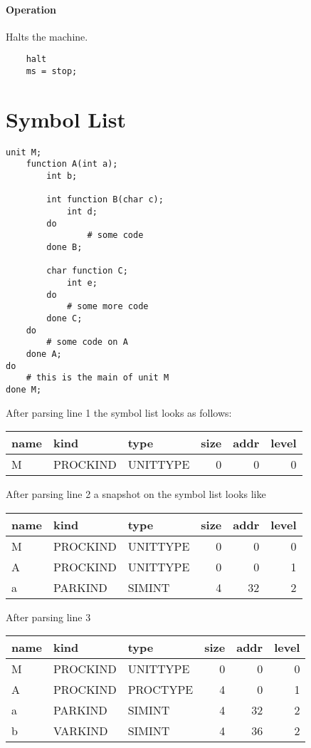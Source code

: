 \subsubsection{Operation}
Halts the machine.

	\begin{lstlisting}
	halt
	ms = stop;
	\end{lstlisting}

\chapter{Symbol List}

\lstset{language=NoBeard,
	numbers=left,
	tabsize=2
}
\begin{lstlisting}
unit M;
	function A(int a);
		int b;
		
		int function B(char c);
			int d;
		do
				# some code
		done B;
		
		char function C;
			int e;
		do
			# some more code
		done C;
	do
		# some code on A
	done A;
do
	# this is the main of unit M
done M;
\end{lstlisting}

After parsing line 1 the symbol list looks as follows:

\begin{tabular}{lllrrr}
name & kind & type & size & addr & level \\
\hline
M & PROCKIND & UNITTYPE & 0 & 0 & 0
\end{tabular}

After parsing line 2 a snapshot on the symbol list looks like

\begin{tabular}{lllrrr}
name & kind & type & size & addr & level \\
\hline
M & PROCKIND & UNITTYPE & 0 & 0 & 0 \\
A & PROCKIND & UNITTYPE & 0 & 0 & 1 \\
a & PARKIND & SIMINT & 4 & 32 & 2
\end{tabular}

After parsing line 3

\begin{tabular}{lllrrr}
name & kind & type & size & addr & level \\
\hline
M & PROCKIND & UNITTYPE & 0 & 0 & 0 \\
A & PROCKIND & PROCTYPE & 4 & 0 & 1 \\
a & PARKIND & SIMINT & 4 & 32 & 2 \\
b & VARKIND & SIMINT & 4 & 36 & 2
\end{tabular}

